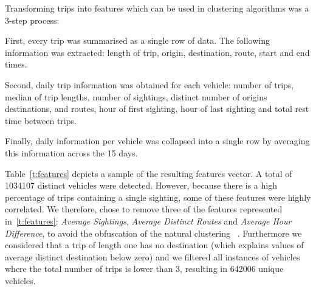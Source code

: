Transforming trips into features which can be used in clustering algorithms was a 3-step process:
\begin{enumerate*}[label=(\roman*)]
  \item First, every trip was summarised as a single row of data. The following information was extracted: length of trip, origin, destination, route, start and end times.
  \item Second, daily trip information was obtained for each vehicle: number of trips, median of trip lengths, number of sightings, distinct number of origins destinations, and routes, hour of first sighting, hour of last sighting and total rest time between trips.
  \item Finally, daily information per vehicle was collapsed into a single row by averaging this information across the 15 days.
\end{enumerate*}

Table~\ref{t:features} depicts a sample of the resulting features vector. A total of 1034107 distinct vehicles were detected. However, because there is a high percentage of trips containing a single sighting, some of these features were highly correlated. We therefore, chose to remove three of the features represented in~\ref{t:features}: \emph{Average Sightings}, \emph{Average Distinct Routes} and \emph{Average Hour Difference}, to avoid the obfuscation of the natural clustering ~\cite{Kmeans}. Furthermore we considered that a trip of length one has no destination (which explains values of average distinct destination below zero) and we filtered all instances of vehicles where the total number of trips is lower than 3, resulting in 642006 unique vehicles.

